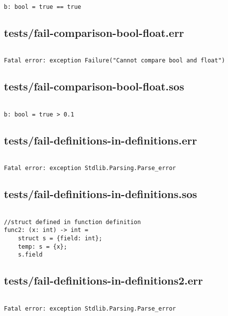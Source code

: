 \documentclass[main.tex]{subfiles}
\begin{document}
\begin{lstlisting}

b: bool = true == true
\end{lstlisting}

\subsection{tests/fail-comparison-bool-float.err}

\begin{lstlisting}

Fatal error: exception Failure("Cannot compare bool and float")
\end{lstlisting}

\subsection{tests/fail-comparison-bool-float.sos}

\begin{lstlisting}

b: bool = true > 0.1
\end{lstlisting}

\subsection{tests/fail-definitions-in-definitions.err}

\begin{lstlisting}

Fatal error: exception Stdlib.Parsing.Parse_error
\end{lstlisting}

\subsection{tests/fail-definitions-in-definitions.sos}

\begin{lstlisting}

//struct defined in function definition
func2: (x: int) -> int = 
    struct s = {field: int};
    temp: s = {x};
    s.field
\end{lstlisting}

\subsection{tests/fail-definitions-in-definitions2.err}

\begin{lstlisting}

Fatal error: exception Stdlib.Parsing.Parse_error
\end{lstlisting}
\end{document}
